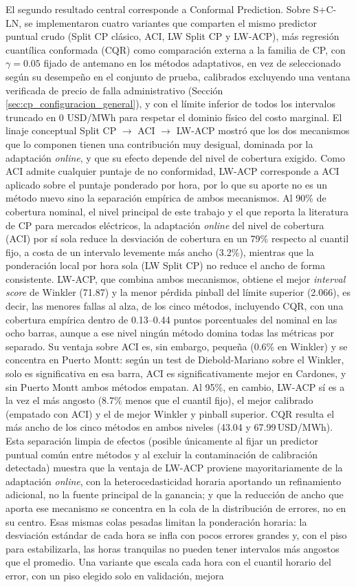 El segundo resultado central corresponde a Conformal Prediction. Sobre S+C-LN, se implementaron cuatro variantes que comparten el mismo predictor puntual crudo (Split CP clásico, ACI, LW Split CP y LW-ACP), más regresión cuantílica conformada (CQR) como comparación externa a la familia de CP, con $\gamma = 0.05$ fijado de antemano en los métodos adaptativos, en vez de seleccionado según su desempeño en el conjunto de prueba, calibrados excluyendo una ventana verificada de precio de falla administrativo (Sección \ref{sec:cp_configuracion_general}), y con el límite inferior de todos los intervalos truncado en 0 USD/MWh para respetar el dominio físico del costo marginal. El linaje conceptual Split CP $\to$ ACI $\to$ LW-ACP mostró que los dos mecanismos que lo componen tienen una contribución muy desigual, dominada por la adaptación \textit{online}, y que su efecto depende del nivel de cobertura exigido. Como ACI admite cualquier puntaje de no conformidad, LW-ACP corresponde a ACI aplicado sobre el puntaje ponderado por hora, por lo que su aporte no es un método nuevo sino la separación empírica de ambos mecanismos. Al 90\% de cobertura nominal, el nivel principal de este trabajo y el que reporta la literatura de CP para mercados eléctricos, la adaptación \textit{online} del nivel de cobertura (ACI) por sí sola reduce la desviación de cobertura en un 79\% respecto al cuantil fijo, a costa de un intervalo levemente más ancho (3.2\%), mientras que la ponderación local por hora sola (LW Split CP) no reduce el ancho de forma consistente. LW-ACP, que combina ambos mecanismos, obtiene el mejor \textit{interval score} de Winkler (71.87) y la menor pérdida pinball del límite superior (2.066), es decir, las menores fallas al alza, de los cinco métodos, incluyendo CQR, con una cobertura empírica dentro de 0.13--0.44 puntos porcentuales del nominal en las ocho barras, aunque a ese nivel ningún método domina todas las métricas por separado. Su ventaja sobre ACI es, sin embargo, pequeña (0.6\% en Winkler) y se concentra en Puerto Montt: según un test de Diebold-Mariano sobre el Winkler, solo es significativa en esa barra, ACI es significativamente mejor en Cardones, y sin Puerto Montt ambos métodos empatan. Al 95\%, en cambio, LW-ACP sí es a la vez el más angosto (8.7\% menos que el cuantil fijo), el mejor calibrado (empatado con ACI) y el de mejor Winkler y pinball superior. CQR resulta el más ancho de los cinco métodos en ambos niveles (43.04 y 67.99\,USD/MWh). Esta separación limpia de efectos (posible únicamente al fijar un predictor puntual común entre métodos y al excluir la contaminación de calibración detectada) muestra que la ventaja de LW-ACP proviene mayoritariamente de la adaptación \textit{online}, con la heterocedasticidad horaria aportando un refinamiento adicional, no la fuente principal de la ganancia; y que la reducción de ancho que aporta ese mecanismo se concentra en la cola de la distribución de errores, no en su centro. Esas mismas colas pesadas limitan la ponderación horaria: la desviación estándar de cada hora se infla con pocos errores grandes y, con el piso para estabilizarla, las horas tranquilas no pueden tener intervalos más angostos que el promedio. Una variante que escala cada hora con el cuantil horario del error, con un piso elegido solo en validación, mejora 